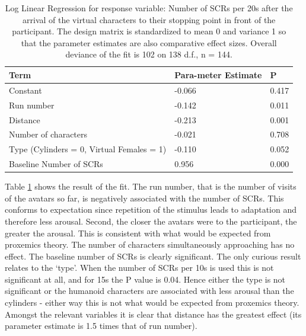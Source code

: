 \documentclass[
		twoside,openright,titlepage,numbers=noenddot,manychapters,
		headinclude,%
                footinclude=false,cleardoublepage=empty,
                BCOR=5mm,
		fontsize=11pt, %
                 enabledeprecatedfontcommands]{scrreprt}
\begin{document}
\begin{table}[tb]
\caption{Log Linear Regression for response variable:  Number of SCRs per 20s after the arrival of the virtual characters to their stopping point in front of the participant. The design matrix is standardized to mean 0 and variance 1 so that the parameter estimates are also comparative effect sizes. 
Overall deviance of the fit is 102 on 138 d.f., n = 144. 
}


\centering
\begin{tabular*}{0.90\textwidth}{ p{}  p{} p{}}
\\
\hline\hline

\textbf{Term} & \textbf{Para-meter Estimate} & \textbf{P}\\
  \hline
  Constant &	-0.066	& 0.417 \\
  Run number	& -0.142	& 0.011 \\
Distance	& -0.213	& 0.001 \\
Number of characters &	-0.021 &	0.708 \\
Type (Cylinders = 0, Virtual Females = 1) &	-0.110 &	0.052 \\
Baseline Number of SCRs &	0.956 &	0.000\\
[1ex]
\hline
\end{tabular*}

\label{table_prox_results2}
\end{table}



Table \ref{table_prox_results2} shows the result of the fit. The run number, that is the number of visits of the avatars so far, is negatively associated with the number of SCRs. This conforms to expectation since repetition of the stimulus leads to adaptation and therefore less arousal. Second, the closer the avatars were to the participant, the greater the arousal. This is consistent with what would be expected from proxemics theory. The number of characters simultaneously approaching has no effect. The baseline number of SCRs is clearly significant. The only curious result relates to the `type'. When the number of SCRs per 10s is used this is not significant at all, and for 15s the P value is 0.04. Hence either the type is not significant or the humanoid characters are associated with less arousal than the cylinders - either way this is not what would be expected from proxemics theory. Amongst the relevant variables it is clear that distance has the greatest effect (its parameter estimate is 1.5 times that of run number).
\end{document}
